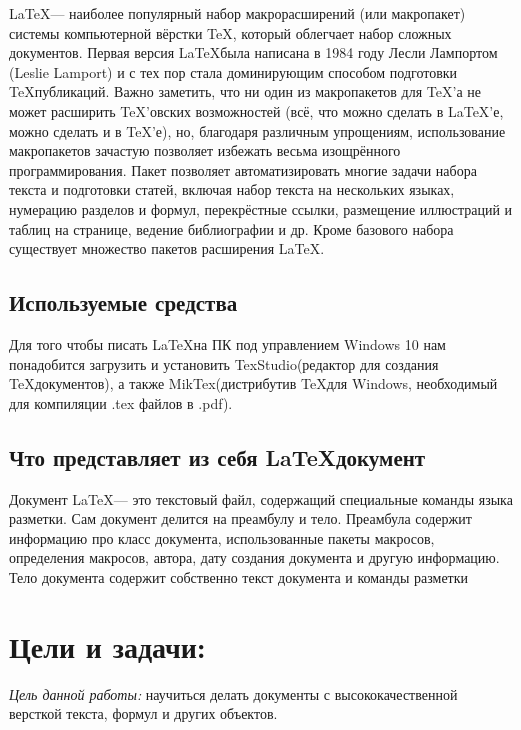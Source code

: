 \documentclass{article}
\begin{document}
\vspace{\baselineskip}
\LaTeX — наиболее популярный набор макрорасширений (или макропакет) системы компьютерной вёрстки TeX, который облегчает набор сложных документов. Первая версия \LaTeX была написана в 1984 году Лесли Лампортом (Leslie Lamport) и с тех пор стала доминирующим способом подготовки \TeX публикаций. Важно заметить, что ни один из макропакетов для \TeX’а не может расширить \TeX’овских возможностей (всё, что можно сделать в LaTeX’е, можно сделать и в \TeX’е), но, благодаря различным упрощениям, использование макропакетов зачастую позволяет избежать весьма изощрённого программирования. Пакет позволяет автоматизировать многие задачи набора текста и подготовки статей, включая набор текста на нескольких языках, нумерацию разделов и формул, перекрёстные ссылки, размещение иллюстраций и таблиц на странице, ведение библиографии и др. Кроме базового набора существует множество пакетов расширения \LaTeX.

\subsection*{Используемые средства}
Для того чтобы писать \LaTeX на ПК под управлением Windows 10 нам понадобится загрузить и установить TexStudio(редактор для создания \TeX документов), а также MikTex(дистрибутив \TeX для Windows, необходимый для компиляции .tex файлов в .pdf).

\subsection*{Что представляет из себя \LaTeX документ}
Документ \LaTeX — это текстовый файл, содержащий специальные команды языка разметки. Сам документ делится на преамбулу и тело. Преамбула содержит информацию про класс документа, использованные пакеты макросов, определения макросов, автора, дату создания документа и другую информацию. Тело документа содержит собственно текст документа и команды разметки
	\section*{Цели и задачи:}
	
	
	\emph{Цель данной работы:} научиться делать документы с высококачественной версткой текста, формул и других объектов.\\
	
\end{document}

